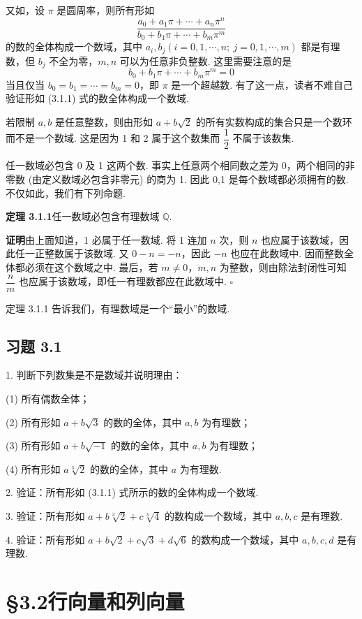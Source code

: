 \documentclass[UTF8,12pt,a4paper,fontset=fandol]{ctexart}
\begin{document}
又如，设 $\pi$ 是圆周率，则所有形如
\begin{equation}
\frac{a_0+a_1\pi+\cdots+a_n\pi^n}{b_0+b_1\pi+\cdots+b_m\pi^m}
\tag{3.1.1}
\end{equation}
的数的全体构成一个数域，其中 $a_i,b_j(i=0,1,\cdots,n;\ j=0,1,\cdots,m)$ 都是有理数，但 $b_j$ 不全为零，$m,n$ 可以为任意非负整数. 这里需要注意的是
\[
b_0+b_1\pi+\cdots+b_m\pi^m=0
\]
当且仅当 $b_0=b_1=\cdots=b_m=0$，即 $\pi$ 是一个超越数. 有了这一点，读者不难自己验证形如 (3.1.1) 式的数全体构成一个数域.

若限制 $a,b$ 是任意整数，则由形如 $a+b\sqrt{2}$ 的所有实数构成的集合只是一个数环而不是一个数域. 这是因为 1 和 2 属于这个数集而 $\dfrac{1}{2}$ 不属于该数集.

任一数域必包含 0 及 1 这两个数. 事实上任意两个相同数之差为 0，两个相同的非零数 (由定义数域必包含非零元) 的商为 1. 因此 0,1 是每个数域都必须拥有的数. 不仅如此，我们有下列命题.

\noindent\textbf{定理 3.1.1}\quad 任一数域必包含有理数域 $\mathbb{Q}$.

\noindent\textbf{证明}\quad 由上面知道，1 必属于任一数域. 将 1 连加 $n$ 次，则 $n$ 也应属于该数域，因此任一正整数属于该数域. 又 $0-n=-n$，因此 $-n$ 也应在此数域中. 因而整数全体都必须在这个数域之中. 最后，若 $m\neq 0$，$m,n$ 为整数，则由除法封闭性可知 $\dfrac{n}{m}$ 也应属于该数域，即任一有理数都应在此数域中. $\square$

定理 3.1.1 告诉我们，有理数域是一个“最小”的数域.

\subsection*{习题 3.1}

1. 判断下列数集是不是数域并说明理由：

(1) 所有偶数全体；

(2) 所有形如 $a+b\sqrt{3}$ 的数的全体，其中 $a,b$ 为有理数；

(3) 所有形如 $a+b\sqrt{-1}$ 的数的全体，其中 $a,b$ 为有理数；

(4) 所有形如 $a\sqrt[3]{2}$ 的数的全体，其中 $a$ 为有理数.

2. 验证：所有形如 (3.1.1) 式所示的数的全体构成一个数域.

3. 验证：所有形如 $a+b\sqrt[3]{2}+c\sqrt[3]{4}$ 的数构成一个数域，其中 $a,b,c$ 是有理数.

4. 验证：所有形如 $a+b\sqrt{2}+c\sqrt{3}+d\sqrt{6}$ 的数构成一个数域，其中 $a,b,c,d$ 是有理数.

\section*{§3.2\quad 行向量和列向量}
\end{document}
